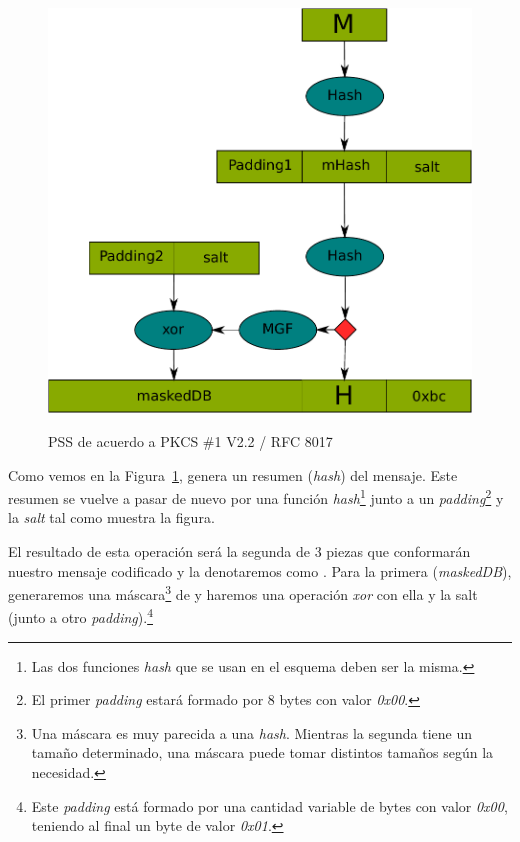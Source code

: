  \begin{figure}[ht]
   \centering
   \includegraphics[scale=2.0]{Figures/PSS}
   \decoRule
   \caption[PSS (Esquema)]{PSS de acuerdo a PKCS \#1 V2.2 / RFC 8017} \emph{\parencite{Reference16}}
   \label{fig:PSS}
 \end{figure}

 Como vemos en la Figura~\ref{fig:PSS},  genera un resumen (\emph{hash}) del mensaje.
 Este resumen se vuelve a pasar de nuevo por una función \emph{hash}\footnote{Las dos funciones \emph{hash} que se usan en el esquema deben ser la misma.} junto a un \emph{padding}\footnote{El primer \emph{padding} estará formado por 8 bytes con valor \emph{0x00}.} y la \emph{salt} tal como muestra la figura.

 El resultado de esta operación será la segunda de 3 piezas que conformarán nuestro mensaje codificado y la denotaremos como .
 Para la primera (\emph{maskedDB}), generaremos una máscara\footnote{Una máscara es muy parecida a una \emph{hash}. Mientras la segunda tiene un tamaño determinado, una máscara puede tomar distintos tamaños según la necesidad.} de  y haremos una operación \emph{xor} con ella y la salt (junto a otro \emph{padding}).\footnote{Este \emph{padding} está formado por una cantidad variable de bytes con valor \emph{0x00}, teniendo al final un byte de valor \emph{0x01}.}

